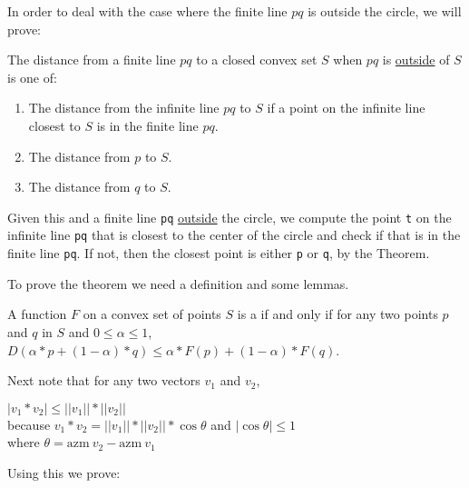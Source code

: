 \documentclass[12pt]{article}
\begin{document}
In order to deal with the case where the finite line $pq$ is outside
the circle, we will prove:

\begin{theorem}\label{POINT-OUTSIDE-THEOREM}
The distance from a finite line $pq$ to a closed convex set $S$ when
$pq$ is \underline{outside} of $S$ is one of:
\begin{enumerate}
\item The distance from the infinite line $pq$ to $S$ if
a point on the infinite line closest to $S$ is in the finite line $pq$.
\item The distance from $p$ to $S$.
\item The distance from $q$ to $S$.
\end{enumerate}
\end{theorem}

Given this and a finite line {\tt pq} \underline{outside} the
circle,
we compute the point {\tt t} on the infinite line {\tt pq} that is
closest to the center of the circle
and check if that is in the finite line {\tt pq}.  If not, then the
closest point is either {\tt p} or {\tt q}, by the Theorem.

To prove the theorem we need a definition and some lemmas.

\begin{definition}
A function $F$ on a convex set of points $S$ is a 
if and only if
for any two points $p$ and $q$ in $S$ and
$0\le\alpha\le 1$,
$D(\alpha*p+(1-\alpha)*q)\le\alpha*F(p) + (1-\alpha)*F(q)$.
\end{definition}

Next note that for any two vectors $v_1$ and $v_2$,
\begin{center}
$|v_1*v_2|\le||v_1||*||v_2||$ \\
because $v_1*v_2 = ||v_1||*||v_2||*\cos\theta$ and $|\cos\theta|\le 1$ \\
where $\theta = \mathrm{azm}~v_2 - \mathrm{azm}~v_1$
\end{center}

Using this we prove:
\end{document}
